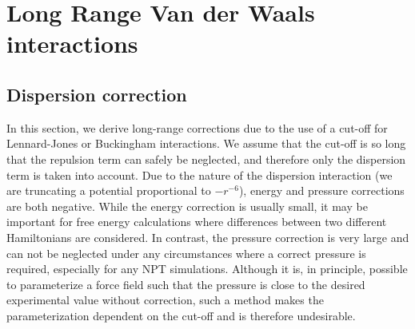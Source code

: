 
\section{Long Range Van der Waals interactions}
\subsection{Dispersion correction}
In this section, we derive long-range corrections due to the use of a
cut-off for Lennard-Jones or Buckingham interactions.
We assume that the cut-off is
so long that the repulsion term can safely be neglected, and therefore
only the dispersion term is taken into account. Due to the nature of
the dispersion interaction (we are truncating a potential proportional
to $-r^{-6}$), energy and pressure corrections are both negative. While
the energy correction is usually small, it may be important for free
energy calculations where differences between two different Hamiltonians
are considered. In contrast, the pressure correction is very large and
can not be neglected under any circumstances where a correct pressure is
required, especially for any NPT simulations. Although it is, in
principle, possible to parameterize a force field such that the pressure
is close to the desired experimental value without correction, such a
method makes the parameterization dependent on the cut-off and is therefore
undesirable.

